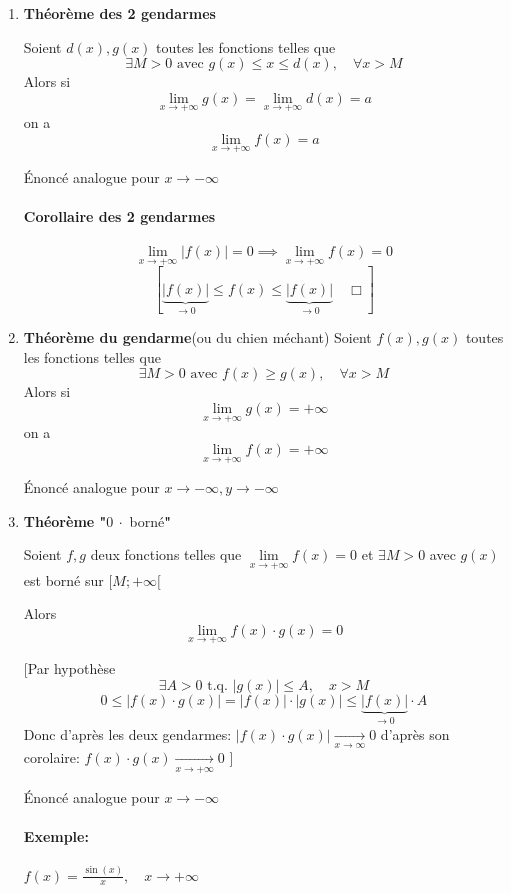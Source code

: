 \documentclass[
    11pt,
    a4paper,
    oneside,
    headinlcude, footinclude,
    twoside,
]{report}
\newcommand{\tq}[0]{\textrm{ t.q. }}
\begin{document}
\begin{enumerate}
\item \textbf{Théorème des 2 gendarmes} 

Soient $d (x), g (x)$  toutes les fonctions telles que $$\exists M > 0
\text{ avec } g (x) \leq x \leq d (x), \quad \forall x > M$$
Alors si $$ \lim_{x \to + \infty} g (x) = \lim_{x \to + \infty} d (x) = a$$
on a $$\lim_{x \to + \infty} f (x) = a$$

Énoncé analogue pour $x \to - \infty$ 

\paragraph{Corollaire des 2 gendarmes}
\label{par:corollaire_des_2_gendarmes}
        
$$ \lim_{x \to + \infty} | f (x) | = 0 \implies \lim_{x \to + \infty} f (x)
= 0$$
$$ [ \underbrace{|f(x)|}_{\to 0} \leq f (x) \leq \underbrace{ | f (x) |}_{\to 0} \quad \Box]$$
\item \textbf{Théorème du gendarme}(ou du chien méchant)
Soient $f (x), g (x)$  toutes les fonctions telles que $$\exists M > 0
\text{ avec } f (x) \geq g (x), \quad \forall x > M$$
Alors si $$ \lim_{x \to + \infty} g (x)  = + \infty$$ on a $$ \lim_{x \to + \infty} f
(x) = + \infty$$

Énoncé analogue pour $x \to - \infty,  y \to - \infty$ 

\item \textbf{Théorème "}$0\ \cdot$ borné\textbf{"}

Soient $f, g$ deux fonctions telles que $\lim\limits_{x \to + \infty}
f (x) = 0$  et $\exists M > 0$ avec $g(x)$ est borné sur $[M; + \infty[$ 

Alors $$ \lim_{x \to + \infty} f(x) \cdot g(x) = 0$$

[Par hypothèse $$ \exists A > 0 \tq |g(x)| \leq A, \quad x > M $$ $$0
\leq |f(x) \cdot g(x)| = |f(x)|\cdot|g(x)| \leq
\underbrace{|f(x)|}_{\to 0} \cdot A$$ Donc d'après les deux
gendarmes: $|f(x) \cdot g(x) |\xrightarrow[x \to \infty]{} 0$ d'après
son corolaire: $f(x) \cdot g(x) \xrightarrow[x \to + \infty]{} 0$ ]

Énoncé analogue pour $x \to - \infty$ 

\paragraph{Exemple:}
        
$f(x) = \frac{\sin(x)}{x},  \quad x \to + \infty$ 


\end{enumerate}
\end{document}
